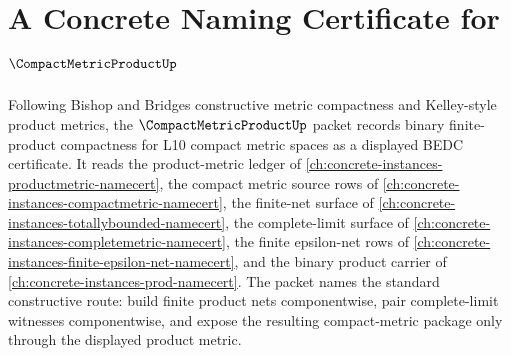 \chapter{A Concrete Naming Certificate for $\CompactMetricProductUp$}
\label{ch:concrete-instances-compact-metric-product-namecert}

Following Bishop and Bridges constructive metric compactness and Kelley-style product metrics, the $\CompactMetricProductUp$ packet records binary finite-product compactness for L10 compact metric spaces as a displayed BEDC certificate. It reads the product-metric ledger of \autoref{ch:concrete-instances-productmetric-namecert}, the compact metric source rows of \autoref{ch:concrete-instances-compactmetric-namecert}, the finite-net surface of \autoref{ch:concrete-instances-totallybounded-namecert}, the complete-limit surface of \autoref{ch:concrete-instances-completemetric-namecert}, the finite epsilon-net rows of \autoref{ch:concrete-instances-finite-epsilon-net-namecert}, and the binary product carrier of \autoref{ch:concrete-instances-prod-namecert}. The packet names the standard constructive route: build finite product nets componentwise, pair complete-limit witnesses componentwise, and expose the resulting compact-metric package only through the displayed product metric.

